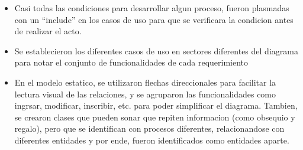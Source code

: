 \begin{itemize}
	\item Casi todas las condiciones para desarrollar algun proceso, fueron plasmadas con un ``include'' en los casos de uso para que se verificara la
		condicion antes de realizar el acto.
	\item Se establecieron los diferentes casos de uso en sectores diferentes del diagrama para notar el conjunto de funcionalidades de cada
		requerimiento
	\item En el modelo estatico, se utilizaron flechas direccionales para facilitar la lectura visual de las relaciones, y se agruparon las funcionalidades como ingrsar, modificar, inscribir, etc. para poder simplificar el diagrama. Tambien, se crearon clases que pueden sonar que repiten informacion (como obsequio y regalo), pero que se identifican con procesos diferentes, relacionandose con diferentes entidades y por ende, fueron identificados como entidades aparte.
\end{itemize}

